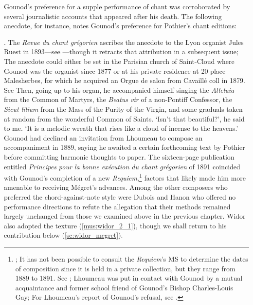 \pagebreak{}
Gounod's preference for a supple performance of chant was corroborated by several journalistic accounts that appeared after his death.
The following anecdote, for instance, notes Gounod's preference for Pothier's chant editions:

  {\cite[pp.~xi--xii]{BoyerdAgenConsiderationsgeniechristianisme1894}. The \emph{Revue du chant grégorien} ascribes the anecdote to the Lyon organist Jules Ruest in 1893---see \cite[62]{RuestGounodchantgregorien1893}---though it retracts that attribution in a subsequent issue; The anecdote could either be set in the Parisian church of Saint-Cloud where Gounod was the organist since 1877 or at his private residence at 20 place Malesherbes, for which he acquired an Orgue de salon from Cavaillé coll in 1879. See \cite[73]{Shuster-FournierorguessalonAristide1997}}
{Then, going up to his organ, he accompanied himself singing the \emph{Alleluia} from the Common of Martyrs, the \emph{Beatus vir} of a non-Pontiff Confessor, the \emph{Sicut lilium} from the Mass of the Purity of the Virgin, and some graduals taken at random from the wonderful Common of Saints. `Isn't that beautiful?', he said to me. `It is a melodic wreath that rises like a cloud of incense to the heavens.'}
\noindent
Gounod had declined an invitation from Lhoumeau to compose an accompaniment in 1889, saying he awaited a certain forthcoming text by Pothier before committing harmonic thoughts to paper.
The sixteen-page publication entitled \covid{}\emph{Principes pour la bonne exécution du chant grégorien} of 1891 coincided with Gounod's completion of a new \emph{Requiem},\footnote{\cites[180]{CombeHistoirerestaurationchant1969}[156]{CombeRestorationGregorianChant2003}; It has not been possible to consult the \emph{Requiem}'s MS to determine the dates of composition since it is held in a private collection, but they range from 1889 to 1891. See \cite[p.~iii]{GounodRequiem2011}; Lhoumeau was put in contact with Gounod by a mutual acquaintance and former school friend of Gounod's Bishop Charles-Louis Gay; For Lhoumeau's report of Gounod's refusal, see .} factors that likely made him more amenable to receiving Mégret's advances.
Among the other composers who preferred the chord-against-note style were Dubois and Hanon who offered no performance directions to refute the allegation that their methods remained largely unchanged from those we examined above in the previous chapter.
Widor also adopted the texture (\cref{mus:widor_2_1}), though we shall return to his contribution below (\cref{sc:widor_megret}).


